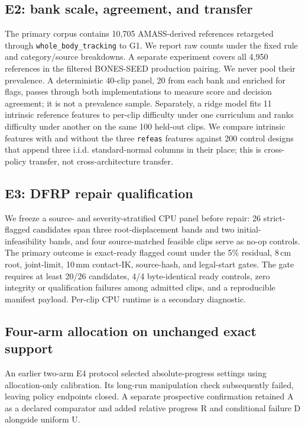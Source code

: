 \documentclass[letterpaper,10pt,conference]{ieeeconf}
\begin{document}
\subsection{E2: bank scale, agreement, and transfer}

The primary corpus contains 10,705 AMASS-derived references retargeted through
\texttt{whole\_body\_tracking} to G1. We report raw counts under the fixed rule and
category/source breakdowns. A separate experiment covers all
4,950 references in the filtered BONES-SEED production pairing. We never pool their prevalence.
A deterministic 40-clip panel, 20 from each bank and enriched for flags, passes through both
implementations to measure score and decision agreement; it is not a prevalence sample.
Separately, a ridge model fits 11 intrinsic reference features to per-clip difficulty under one
curriculum and ranks difficulty under another on the same 100 held-out clips. We compare intrinsic
features with and without the three \texttt{refeas} features against 200 control designs that
append three i.i.d. standard-normal columns in their place; this is cross-policy transfer, not
cross-architecture transfer.

\subsection{E3: DFRP repair qualification}

We freeze a source- and severity-stratified CPU panel before repair: 26 strict-flagged candidates
span three root-displacement bands and two initial-infeasibility bands, and four source-matched
feasible clips serve as no-op controls. The primary outcome is exact-ready flagged count under the
5\% residual, 8\,cm root, joint-limit, 10\,mm contact-IK, source-hash, and legal-start gates. The
gate requires at least 20/26 candidates, 4/4 byte-identical ready controls, zero integrity or
qualification failures among admitted clips, and a reproducible manifest payload. Per-clip CPU
runtime is a secondary diagnostic.

\subsection{Four-arm allocation on unchanged exact support}
An earlier two-arm E4 protocol selected absolute-progress settings using allocation-only
calibration. Its long-run manipulation check subsequently failed, leaving policy endpoints
closed. A separate prospective confirmation retained A as a declared comparator and added
relative progress R and conditional failure D alongside uniform U.
\end{document}
